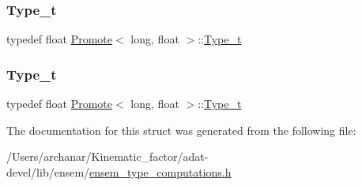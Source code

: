 \subsubsection{\texorpdfstring{Type\_t}{Type\_t}\hspace{0.1cm}{\footnotesize\ttfamily [2/3]}}
{\footnotesize\ttfamily typedef float \mbox{\hyperlink{structPromote}{Promote}}$<$ long, float $>$\+::\mbox{\hyperlink{structPromote_3_01long_00_01float_01_4_adf8f8e314d4cc953a8bec5fad1b5a495}{Type\+\_\+t}}}

\mbox{\label{structPromote_3_01long_00_01float_01_4_adf8f8e314d4cc953a8bec5fad1b5a495}} 
\subsubsection{\texorpdfstring{Type\_t}{Type\_t}\hspace{0.1cm}{\footnotesize\ttfamily [3/3]}}
{\footnotesize\ttfamily typedef float \mbox{\hyperlink{structPromote}{Promote}}$<$ long, float $>$\+::\mbox{\hyperlink{structPromote_3_01long_00_01float_01_4_adf8f8e314d4cc953a8bec5fad1b5a495}{Type\+\_\+t}}}



The documentation for this struct was generated from the following file\+:\begin{DoxyCompactItemize}
\item 
/\+Users/archanar/\+Kinematic\+\_\+factor/adat-\/devel/lib/ensem/\mbox{\hyperlink{adat-devel_2lib_2ensem_2ensem__type__computations_8h}{ensem\+\_\+type\+\_\+computations.\+h}}\end{DoxyCompactItemize}
